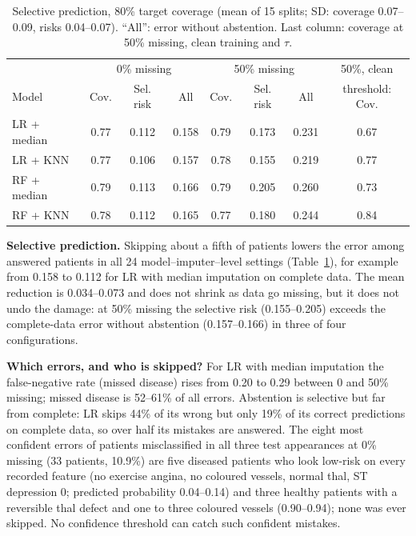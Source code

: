 \documentclass{article}
\begin{document}
\begin{table}[t]
  \caption{Selective prediction, 80\% target coverage (mean of 15 splits; SD: coverage 0.07--0.09, risks 0.04--0.07). ``All'': error without abstention. Last column: coverage at 50\% missing, clean training and $\tau$.}
  \label{tab:sel}
  \centering
  \footnotesize
  \setlength{\tabcolsep}{4pt}
  \begin{tabular}{lccc|ccc|c}
    \toprule
    & \multicolumn{3}{c|}{0\% missing} & \multicolumn{3}{c|}{50\% missing} & 50\%, clean\\
    Model & Cov. & Sel. risk & All & Cov. & Sel. risk & All & threshold: Cov.\\
    \midrule
    LR + median & 0.77 & 0.112 & 0.158 & 0.79 & 0.173 & 0.231 & 0.67\\
    LR + KNN    & 0.77 & 0.106 & 0.157 & 0.78 & 0.155 & 0.219 & 0.77\\
    RF + median & 0.79 & 0.113 & 0.166 & 0.79 & 0.205 & 0.260 & 0.73\\
    RF + KNN    & 0.78 & 0.112 & 0.165 & 0.77 & 0.180 & 0.244 & 0.84\\
    \bottomrule
  \end{tabular}
\end{table}
\textbf{Selective prediction.} Skipping about a fifth of patients lowers the error among answered patients in all 24 model--imputer--level settings (Table~\ref{tab:sel}), for example from 0.158 to 0.112 for LR with median imputation on complete data. The mean reduction is 0.034--0.073 and does not shrink as data go missing, but it does not undo the damage: at 50\% missing the selective risk (0.155--0.205) exceeds the complete-data error without abstention (0.157--0.166) in three of four configurations.

\textbf{Which errors, and who is skipped?} For LR with median imputation the false-negative rate (missed disease) rises from 0.20 to 0.29 between 0 and 50\% missing; missed disease is 52--61\% of all errors. Abstention is selective but far from complete: LR skips 44\% of its wrong but only 19\% of its correct predictions on complete data, so over half its mistakes are answered. The eight most confident errors of patients misclassified in all three test appearances at 0\% missing (33 patients, 10.9\%) are five diseased patients who look low-risk on every recorded feature (no exercise angina, no coloured vessels, normal thal, ST depression 0; predicted probability 0.04--0.14) and three healthy patients with a reversible thal defect and one to three coloured vessels (0.90--0.94); none was ever skipped. No confidence threshold can catch such confident mistakes.
\end{document}
